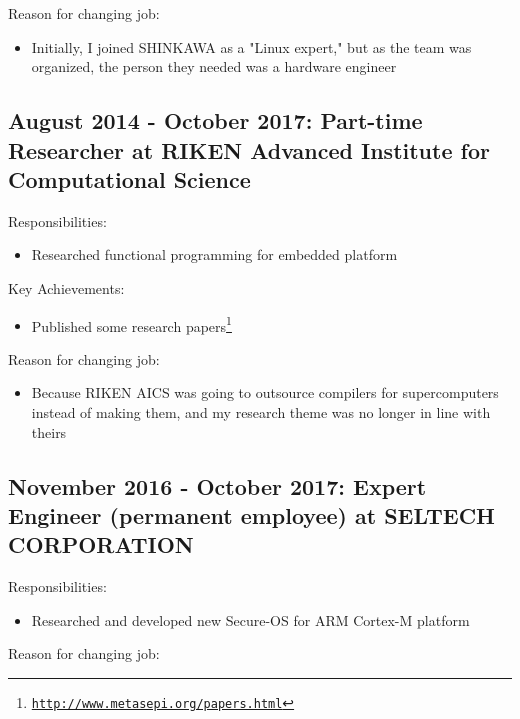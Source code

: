 \documentclass[letterpaper]{article}
\begin{document}
\noindent Reason for changing job:

\begin{itemize}
  \item Initially, I joined SHINKAWA as a "Linux expert," but as the team was organized, the person they needed was a hardware engineer
\end{itemize}

\subsection*{August 2014 - October 2017: Part-time Researcher at RIKEN Advanced Institute for Computational Science}

\noindent Responsibilities:

\begin{itemize}
  \item Researched functional programming for embedded platform
\end{itemize}

\noindent Key Achievements:

\begin{itemize}
  \item Published some research papers\footnote{\href{http://www.metasepi.org/papers.html}{\tt http://www.metasepi.org/papers.html}}
\end{itemize}

\noindent Reason for changing job:

\begin{itemize}
  \item Because RIKEN AICS was going to outsource compilers for supercomputers instead of making them, and my research theme was no longer in line with theirs
\end{itemize}

\subsection*{November 2016 - October 2017: Expert Engineer (permanent employee) at SELTECH CORPORATION}

\noindent Responsibilities:

\begin{itemize}
  \item Researched and developed new Secure-OS for ARM Cortex-M platform
\end{itemize}

\noindent Reason for changing job:
\end{document}

